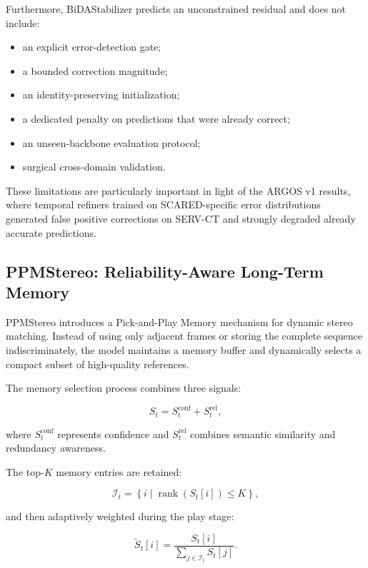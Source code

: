 \documentclass[11pt,a4paper]{article}
\begin{document}
Furthermore, BiDAStabilizer predicts an unconstrained residual and does not include:

\begin{itemize}
    \item an explicit error-detection gate;
    \item a bounded correction magnitude;
    \item an identity-preserving initialization;
    \item a dedicated penalty on predictions that were already correct;
    \item an unseen-backbone evaluation protocol;
    \item surgical cross-domain validation.
\end{itemize}

These limitations are particularly important in light of the ARGOS v1 results, where temporal refiners trained on SCARED-specific error distributions generated false positive corrections on SERV-CT and strongly degraded already accurate predictions.

\subsection{PPMStereo: Reliability-Aware Long-Term Memory}

PPMStereo introduces a Pick-and-Play Memory mechanism for dynamic stereo matching. Instead of using only adjacent frames or storing the complete sequence indiscriminately, the model maintains a memory buffer and dynamically selects a compact subset of high-quality references.

The memory selection process combines three signals:

\begin{equation}
S_t
=
S_t^{\mathrm{conf}}
+
S_t^{\mathrm{rel}},
\end{equation}

where $S_t^{\mathrm{conf}}$ represents confidence and $S_t^{\mathrm{rel}}$ combines semantic similarity and redundancy awareness.

The top-$K$ memory entries are retained:

\begin{equation}
\mathcal{I}_t
=
\left\{
i
\mid
\operatorname{rank}(S_t[i])
\leq K
\right\},
\end{equation}

and then adaptively weighted during the play stage:

\begin{equation}
\tilde{S}_t[i]
=
\frac{S_t[i]}
{\sum_{j \in \mathcal{I}_t} S_t[j]}.
\end{equation}
\end{document}
